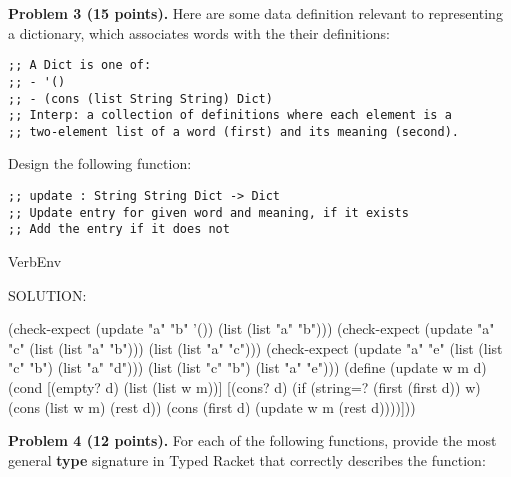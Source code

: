 \documentclass[12pt]{article}
\begin{document}


\newpage

\noindent
{\bf Problem 3 (15 points).}
%
Here are some data definition relevant to representing a dictionary,
which associates words with the their definitions:

\begin{verbatim}
;; A Dict is one of:
;; - '()
;; - (cons (list String String) Dict)
;; Interp: a collection of definitions where each element is a 
;; two-element list of a word (first) and its meaning (second).
\end{verbatim}

\noindent
Design the following function:

\begin{verbatim}
;; update : String String Dict -> Dict
;; Update entry for given word and meaning, if it exists
;; Add the entry if it does not
\end{verbatim}

\begin{SaveVerbatim}{VerbEnv}

SOLUTION:

(check-expect (update "a" "b" '()) (list (list "a" "b")))
(check-expect (update "a" "c" (list (list "a" "b")))
              (list (list "a" "c")))
(check-expect (update "a" "e" (list (list "c" "b") (list "a" "d"))) 
              (list (list "c" "b") (list "a" "e")))
(define (update w m d)
  (cond [(empty? d) (list (list w m))]
        [(cons? d)
         (if (string=? (first (first d)) w)
             (cons (list w m) (rest d))
             (cons (first d) (update w m (rest d))))]))
\end{SaveVerbatim}


\newpage

\noindent
{\bf Problem 4 (12 points).}
%
For each of the following functions, provide the most general {\bf type} signature
in Typed Racket that correctly describes the function:
\end{document}
